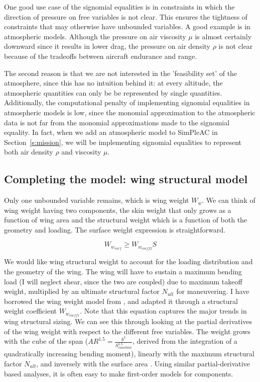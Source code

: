 One good use case of the signomial equalities is in constraints in which the direction
of pressure on free variables is not clear. This ensures the tightness of constraints
that may otherwise have unbounded variables. A good example is in atmospheric models.
Although the pressure on air viscosity $\mu$ is almost certainly downward since it results in
lower drag, the pressure on air density $\rho$ is not clear because of the tradeoffs between
aircraft endurance and range.

The second reason is that we are not interested in the 'feasibility set' of the atmosphere,
since this has no intuition behind it: at every altitude, the atmospheric quantities
can only be be represented by single quantities. Additionally, the computational penalty of
implementing signomial equalities in atmospheric models is low, since the monomial approximation
to the atmospheric data is not far from the monomial approximations made to the signomial equality.
In fact, when we add an atmospheric model to SimPleAC in
Section~\ref{s:mission}, we will be implementing signomial equalities to represent both air density
$\rho$ and viscosity $\mu$.

\subsection{Completing the model: wing structural model}
\label{s:wingstrc}

Only one unbounded variable remains, which is wing weight $W_w$. We can think
of wing weight having two components, the skin weight that
only grows as a function of wing area and the structural weight which is a function of
both the geometry and loading. The surface weight expression is straightforward.

\begin{equation} W_{w_{surf}} \geq W_{w_{coeff2}} S \label{e:wwsurf} \end{equation}

We would like wing structural weight to account for the loading distribution and the geometry
of the wing. The wing will have to sustain a maximum bending load (I will neglect shear, since
the two are coupled) due to maximum takeoff weight,
multiplied by an ultimate structural factor $N_{ult}$ for maneuvering.
I have borrowed the wing weight model from \cite{gp_ac_design}, and adapted it through a
structural weight coefficient $W_{w_{coeff1}}$. Note that this equation captures the
major trends in wing structural sizing. We can see this through looking at the partial
derivatives of the wing weight with respect to the different free variables.
The weight grows with the cube of the span ($AR^{1.5} = \frac{b^3}{S_{constant}^{1.5}}$, derived
from the integration of a quadratically increasing bending moment),
linearly with the maximum structural factor $N_{ult}$, and inversely with the
surface area \footnotemark. Using similar partial-derivative based analyses, it
is often easy to make first-order models for components.

